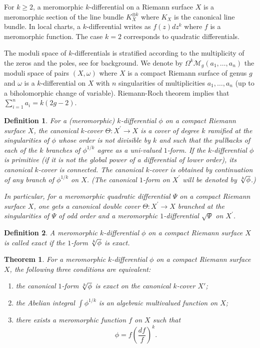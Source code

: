\documentclass[reqno]{amsart}
\newtheorem{theorem}{Theorem}
\newtheorem{definition}{Definition}
\theoremstyle{definition}
\theoremstyle{remark}
\theoremstyle{definition}
\theoremstyle{definition}
\theoremstyle{definition}
\begin{document}
For $k \geq 2$, a meromorphic $k$-differential on a Riemann surface $X$ is a meromorphic section of the line bundle $K_{X}^{\otimes k}$ where $K_{X}$ is the canonical line bundle. In local charts, a $k$-differential writes as $f(z)dz^{k}$ where $f$ is a meromorphic function. The case $k = 2$ corresponds to quadratic differentials.
\par
The moduli space of $k$-differentials is stratified according to the multiplicity of the zeros and the poles, see \cite{BCGGM} for background. We denote by $\Omega^{k}\mathcal{M}_{g}(a_{1},\dots,a_{n})$ the moduli space of pairs $(X,\omega)$ where $X$ is a compact Riemann surface of genus $g$ and $\omega$ is a $k$-differential on $X$ with $n$ singularities of multiplicities $a_{1},\dots,a_{n}$ (up to a biholomorphic change of variable). Riemann-Roch theorem implies that $\sum\limits_{i=1}^{n} a_{i} = k(2g-2)$.

\begin{definition} {\rm 
For a (meromorphic) $k$-differential $\phi$ on a compact Riemann surface $X$, the canonical $k$-cover $\Theta :{X^\prime}\longrightarrow X$ is a cover of degree $k$ ramified at the singularities of $\phi$ whose order is not divisible by $k$ and such that the pullbacks of each of the $k$ branches of $\phi^{1/k}$ agree as a uni-valued $1$-form. If the $k$-differential $\phi$ is primitive (if it is not the global power of a differential of lower order), its canonical $k$-cover is connected. The canonical $k$-cover is obtained by continuation of any branch of $\phi^{1/k}$ on $X$. (The canonical $1$-form on $X^\prime$ will be denoted by $\root k \of \phi$.)

In particular, for a meromorphic quadratic differential $\Psi$ on a compact Riemann surface $X$, one gets a canonical double cover $\Theta: X^\prime \to X$ branched at the singularities of $\Psi$ of odd order and a meromorphic $1$-differential $\sqrt \Psi$ on $X^\prime$.}
\end{definition}

\begin{definition} {\rm A meromorphic $k$-differential $\phi$ on a compact Riemann surface $X$ is called {\emph exact} if the $1$-form $\root k \of \phi$ is exact.}
\end{definition}

\begin{theorem}\label{thm:exact-k}
For a meromorphic $k$-differential $\phi$ on a compact Riemann surface $X$, the following three conditions are equivalent:
\begin{enumerate}
\item the canonical $1$-form $\root k \of \phi$ is exact on the canonical $k$-cover $X'$;
\item the Abelian integral $\int \phi^{1/k}$ is an algebraic multivalued function on $X$;
\item there exists a meromorphic function $f$ on $X$ such that
\[
 \phi=f\left(\frac{df}{f}\right)^k.
\]
\end{enumerate}
\end{theorem}
\end{document}
